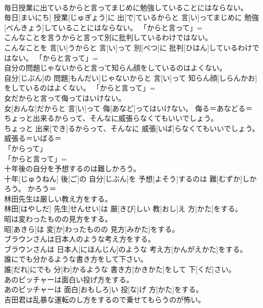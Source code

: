 \documentclass[8pt]{extreport}
\begin{document}
\begin{CJK}{UTF8}{min}
\\	毎日授業に出ているからと言ってまじめに勉強していることにはならない。	
\\	毎日[まいにち] 授業[じゅぎょう]に 出[で]ているからと 言[い]ってまじめに 勉強[べんきょう]していることにはならない。	「からと言って」= 
\\	こんなことを言うからと言って別に批判しているわけではない。	
\\	こんなことを 言[い]うからと 言[い]って 別[べつ]に 批判[ひはん]しているわけではない。	「からと言って」= 
\\	自分の問題じゃないからと言って知らん顔をしているのはよくない。	
\\	自分[じぶん]の 問題[もんだい]じゃないからと 言[い]って 知らん顔[しらんかお]をしているのはよくない。	「からと言って」= 
\\	女だからと言って侮ってはいけない。	
\\	女[おんな]だからと 言[い]って 侮[あなど]ってはいけない。	侮る＝あなどる＝ 
\\	ちょっと出来るからって、そんなに威張らなくてもいいでしょう。	
\\	ちょっと 出来[でき]るからって、そんなに 威張[いば]らなくてもいいでしょう。	威張る＝いばる＝ 
\\	「からって」
\\	「からと言って」= 
\\	十年後の自分を予想するのは難しかろう。	
\\	十年[じゅうねん] 後[ご]の 自分[じぶん]を 予想[よそう]するのは 難[むずか]しかろう。	かろう＝ 
\\	林田先生は厳しい教え方をする。	
\\	林田[はやしだ] 先生[せんせい]は 厳[きび]しい 教[おし]え 方[かた]をする。	
\\	昭は変わったものの見方をする。	
\\	昭[あきら]は 変[か]わったものの 見方[みかた]をする。	
\\	ブラウンさんは日本人のような考え方をする。	
\\	ブラウンさんは 日本人[にほんじん]のような 考え方[かんがえかた]をする。	
\\	誰にでも分かるような書き方をして下さい。	
\\	誰[だれ]にでも 分[わ]かるような 書き方[かきかた]をして 下[くだ]さい。	
\\	あのピッチャーは面白い投げ方をする。	
\\	あのピッチャーは 面白[おもしろ]い 投[な]げ 方[かた]をする。	
\\	吉田君は乱暴な運転のし方をするので乗せてもらうのが怖い。	

\end{CJK}
\end{document}
